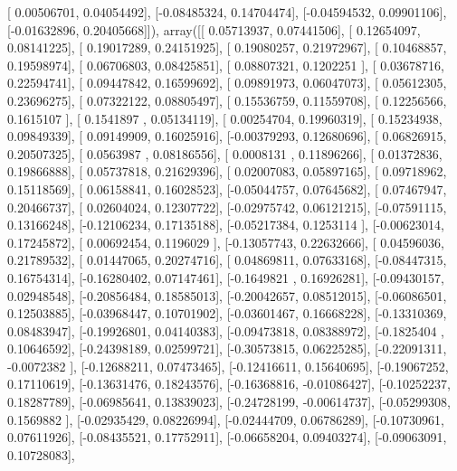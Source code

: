 \documentclass{article}
\begin{document}
       [ 0.00506701,  0.04054492],
       [-0.08485324,  0.14704474],
       [-0.04594532,  0.09901106],
       [-0.01632896,  0.20405668]]), array([[ 0.05713937,  0.07441506],
       [ 0.12654097,  0.08141225],
       [ 0.19017289,  0.24151925],
       [ 0.19080257,  0.21972967],
       [ 0.10468857,  0.19598974],
       [ 0.06706803,  0.08425851],
       [ 0.08807321,  0.1202251 ],
       [ 0.03678716,  0.22594741],
       [ 0.09447842,  0.16599692],
       [ 0.09891973,  0.06047073],
       [ 0.05612305,  0.23696275],
       [ 0.07322122,  0.08805497],
       [ 0.15536759,  0.11559708],
       [ 0.12256566,  0.1615107 ],
       [ 0.1541897 ,  0.05134119],
       [ 0.00254704,  0.19960319],
       [ 0.15234938,  0.09849339],
       [ 0.09149909,  0.16025916],
       [-0.00379293,  0.12680696],
       [ 0.06826915,  0.20507325],
       [ 0.0563987 ,  0.08186556],
       [ 0.0008131 ,  0.11896266],
       [ 0.01372836,  0.19866888],
       [ 0.05737818,  0.21629396],
       [ 0.02007083,  0.05897165],
       [ 0.09718962,  0.15118569],
       [ 0.06158841,  0.16028523],
       [-0.05044757,  0.07645682],
       [ 0.07467947,  0.20466737],
       [ 0.02604024,  0.12307722],
       [-0.02975742,  0.06121215],
       [-0.07591115,  0.13166248],
       [-0.12106234,  0.17135188],
       [-0.05217384,  0.1253114 ],
       [-0.00623014,  0.17245872],
       [ 0.00692454,  0.1196029 ],
       [-0.13057743,  0.22632666],
       [ 0.04596036,  0.21789532],
       [ 0.01447065,  0.20274716],
       [ 0.04869811,  0.07633168],
       [-0.08447315,  0.16754314],
       [-0.16280402,  0.07147461],
       [-0.1649821 ,  0.16926281],
       [-0.09430157,  0.02948548],
       [-0.20856484,  0.18585013],
       [-0.20042657,  0.08512015],
       [-0.06086501,  0.12503885],
       [-0.03968447,  0.10701902],
       [-0.03601467,  0.16668228],
       [-0.13310369,  0.08483947],
       [-0.19926801,  0.04140383],
       [-0.09473818,  0.08388972],
       [-0.1825404 ,  0.10646592],
       [-0.24398189,  0.02599721],
       [-0.30573815,  0.06225285],
       [-0.22091311, -0.0072382 ],
       [-0.12688211,  0.07473465],
       [-0.12416611,  0.15640695],
       [-0.19067252,  0.17110619],
       [-0.13631476,  0.18243576],
       [-0.16368816, -0.01086427],
       [-0.10252237,  0.18287789],
       [-0.06985641,  0.13839023],
       [-0.24728199, -0.00614737],
       [-0.05299308,  0.1569882 ],
       [-0.02935429,  0.08226994],
       [-0.02444709,  0.06786289],
       [-0.10730961,  0.07611926],
       [-0.08435521,  0.17752911],
       [-0.06658204,  0.09403274],
       [-0.09063091,  0.10728083],
\end{document}
